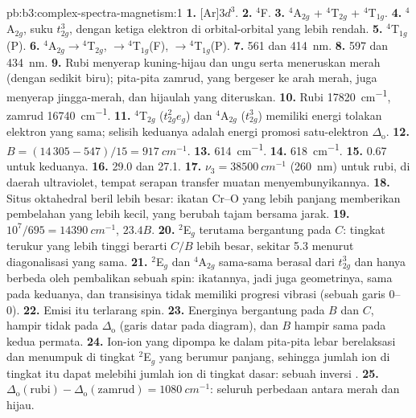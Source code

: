 \begin{solution}{pb:b3:complex-spectra-magnetism:1}
\textbf{1.} [Ar]$3d^3$.
\textbf{2.} $^4$F.
\textbf{3.} $^4$A$_{2g}$ + $^4$T$_{2g}$ + $^4$T$_{1g}$.
\textbf{4.} $^4$A$_{2g}$, suku $t_{2g}^3$, dengan ketiga elektron di orbital-orbital yang lebih rendah.
\textbf{5.} $^4$T$_{1g}$(P).
\textbf{6.} $^4$A$_{2g}\to{}^4$T$_{2g}$, $\to{}^4$T$_{1g}$(F), $\to{}^4$T$_{1g}$(P).
\textbf{7.} 561 dan \qty{414}{nm}.
\textbf{8.} 597 dan \qty{434}{nm}.
\textbf{9.} Rubi menyerap kuning-hijau dan ungu serta meneruskan merah (dengan
sedikit biru); pita-pita zamrud, yang bergeser ke arah merah, juga menyerap
jingga-merah, dan hijaulah yang diteruskan.
\textbf{10.} Rubi \qty{17820}{cm^{-1}}, zamrud \qty{16740}{cm^{-1}}.
\textbf{11.} $^4$T$_{2g}$ ($t_{2g}^2e_g$) dan $^4$A$_{2g}$ ($t_{2g}^3$) memiliki energi tolakan elektron yang sama; selisih
keduanya adalah energi promosi satu-elektron $\Delta_{\mathrm o}$.
\textbf{12.} $B = (14\,305 - 547)/15 = \qty{917}{cm^{-1}}$.
\textbf{13.} \qty{614}{cm^{-1}}.
\textbf{14.} \qty{618}{cm^{-1}}.
\textbf{15.} 0.67 untuk keduanya.
\textbf{16.} 29.0 dan 27.1.
\textbf{17.} $\nu_3 = \qty{38500}{cm^{-1}}$ (\qty{260}{nm}) untuk rubi, di daerah ultraviolet, tempat serapan
transfer muatan menyembunyikannya.
\textbf{18.} Situs oktahedral beril lebih besar: ikatan Cr--O yang lebih panjang memberikan
pembelahan yang lebih kecil, yang berubah tajam bersama jarak.
\textbf{19.} $10^7/695 = \qty{14390}{cm^{-1}}$, $23.4B$.
\textbf{20.} $^2$E$_g$ terutama bergantung pada $C$: tingkat terukur yang lebih tinggi berarti $C/B$ lebih besar,
sekitar 5.3 menurut diagonalisasi yang sama.
\textbf{21.} $^2$E$_g$ dan $^4$A$_{2g}$ sama-sama berasal dari $t_{2g}^3$ dan hanya berbeda oleh pembalikan sebuah spin: ikatannya,
jadi juga geometrinya, sama pada keduanya, dan transisinya tidak memiliki
progresi vibrasi (sebuah garis 0--0).
\textbf{22.} Emisi itu terlarang spin.
\textbf{23.} Energinya bergantung pada $B$ dan $C$, hampir tidak pada $\Delta_{\mathrm o}$ (garis datar pada diagram),
dan $B$ hampir sama pada kedua permata.
\textbf{24.} Ion-ion yang dipompa ke dalam pita-pita lebar berelaksasi dan menumpuk di tingkat
$^2$E$_g$ yang berumur panjang, sehingga jumlah ion di tingkat itu dapat melebihi jumlah ion di tingkat dasar:
sebuah inversi .
\textbf{25.} \textbf{$\Delta_{\mathrm o}(\text{rubi}) - \Delta_{\mathrm o}(\text{zamrud}) = \qty{1080}{cm^{-1}}$}: seluruh perbedaan antara merah dan
hijau.
\end{solution}
